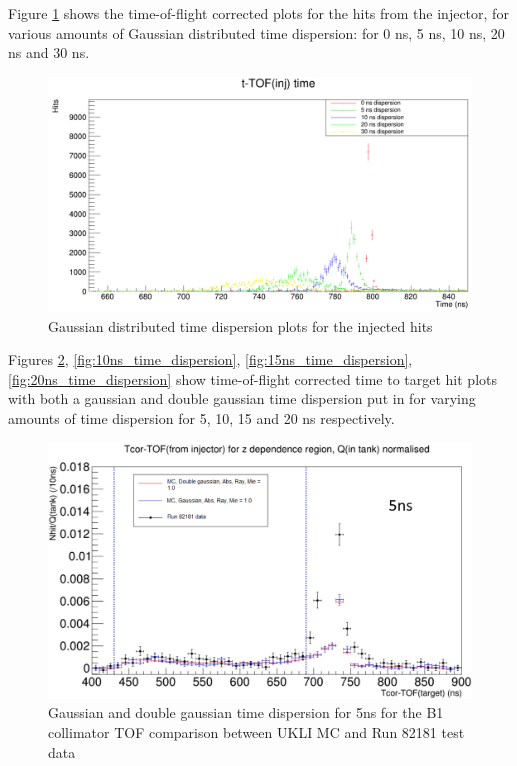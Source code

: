 Figure \ref{fig:TOF_inj} shows the time-of-flight corrected plots for the hits from the injector, for various amounts of Gaussian distributed time dispersion: for 0 ns, 5 ns, 10 ns, 20 ns and 30 ns. 

\begin{figure}
    \centering
    \includegraphics[width=\textwidth]{Figures/TOF_inj.PNG}
    \caption{Gaussian distributed time dispersion plots for the injected hits}
    \label{fig:TOF_inj}
\end{figure}

Figures \ref{fig:5ns_time_dispersion}, \ref{fig:10ns_time_dispersion}, \ref{fig:15ns_time_dispersion}, \ref{fig:20ns_time_dispersion} show time-of-flight corrected time to target hit plots with both a gaussian and double gaussian time dispersion put in for varying amounts of time dispersion for 5, 10, 15 and 20 ns respectively.


\begin{figure}
    \centering
    \includegraphics[width=\textwidth]{Figures/time_dispersion_TOF_5ns.PNG}
    \caption{Gaussian and double gaussian time dispersion for 5ns for the B1 collimator TOF comparison between UKLI MC and Run 82181 test data}
    \label{fig:5ns_time_dispersion}
\end{figure}

